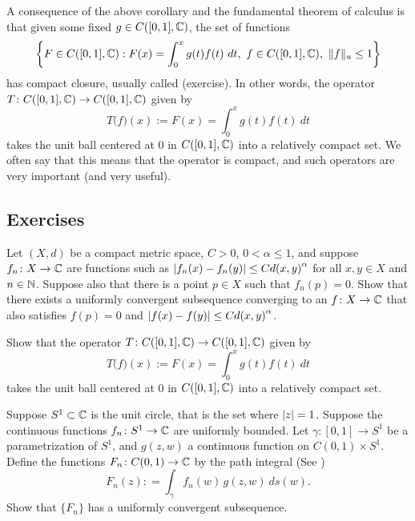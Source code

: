 A consequence of the above corollary and the fundamental theorem of calculus
is that given some fixed $g \in
C([0,1],{\mathbb{C}})$,
the set of functions
\begin{equation*}
\left\{
F \in C([0,1],{\mathbb{C}}) : F(x) = \int_0^x g(t) f(t)~dt,~ f \in C([0,1],{\mathbb{C}}),~
\lVert {f} \rVert_u \leq 1
\right\}
\end{equation*}
has compact closure, usually called
\emph{} (exercise).
In other words, the operator $T \colon C([0,1],{\mathbb{C}}) \to C([0,1],{\mathbb{C}})$ given by
\begin{equation*}
T\bigl(f\bigr) (x) := F(x) = \int_0^x g(t) f(t)~dt
\end{equation*}
takes the unit ball centered at 0 in $C([0,1],{\mathbb{C}})$ into a relatively compact set.  We often
say that this means that the operator is compact, and such operators are very
important (and very useful).

\subsection{Exercises}

\begin{exercise}
Let $(X,d)$ be a compact metric space, $C > 0$, $0 < \alpha \leq 1$, and
suppose $f_n \colon X \to {\mathbb{C}}$ are functions such as
$\left\lvert {f_n(x)-f_n(y)} \right\rvert \leq C {d(x,y)}^\alpha$ for all $x,y \in X$ and
$n \in {\mathbb{N}}$.  Suppose also that there is a point $p \in X$ such that
$f_n(p) = 0$.
Show that there exists a uniformly convergent subsequence converging to
an $f \colon X \to {\mathbb{C}}$ that also satisfies $f(p) = 0$ and
$\left\lvert {f(x)-f(y)} \right\rvert \leq C {d(x,y)}^\alpha$.
\end{exercise}

\begin{exercise}
Show that the operator $T \colon C([0,1],{\mathbb{C}}) \to C([0,1],{\mathbb{C}})$ given by
\begin{equation*}
T\bigl(f\bigr) (x) := F(x) = \int_0^x g(t) f(t)~dt
\end{equation*}
takes the unit ball centered at 0 in $C([0,1],{\mathbb{C}})$ into a
relatively compact set.
\end{exercise}

\begin{exercise}
Suppose $S^1 \subset {\mathbb{C}}$ is the unit circle, that is the set where
$\lvert {z} \rvert=1$.  Suppose the continuous functions
$f_n \colon S^1 \to {\mathbb{C}}$ are uniformly bounded.
Let $\gamma \colon [0,1] \to S^1$ be a parametrization of $S^1$,
and $g(z,w)$ a continuous function on $C(0,1) \times S^1$.  Define
the functions $F_n \colon C(0,1) \to {\mathbb{C}}$ by
the path integral (See )
\begin{equation*}
F_n(z) : = \int_\gamma f_n(w)\, g(z,w) ~ ds(w) . 
\end{equation*}
Show that $\{ F_n \}$ has a uniformly convergent subsequence.
\end{exercise}


